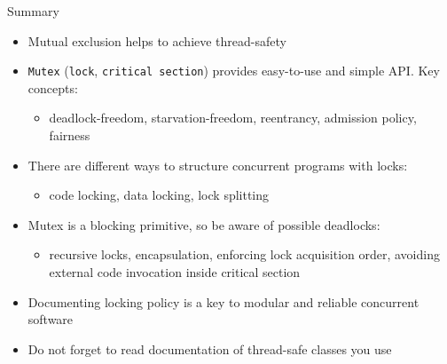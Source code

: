 \begin{frame}{Summary}

\begin{itemize}
    \item Mutual exclusion helps to achieve thread-safety
    \item \texttt{Mutex} (\texttt{lock}, \texttt{critical section}) provides easy-to-use and simple API. Key concepts:
    \begin{itemize}
        \item deadlock-freedom, starvation-freedom, reentrancy, admission policy, fairness
    \end{itemize} 

    \item There are different ways to structure concurrent programs with locks:
    \begin{itemize}
        \item code locking, data locking, lock splitting
    \end{itemize}

    \item Mutex is a blocking primitive, so be aware of possible deadlocks:
    \begin{itemize}
        \item recursive locks, encapsulation, enforcing lock acquisition order, avoiding external code invocation inside critical section
    \end{itemize}

    \item Documenting locking policy is a key to modular and reliable concurrent software
    \item Do not forget to read documentation of thread-safe classes you use
\end{itemize}

\end{frame}


%
%
%
%
%
%
%
%

